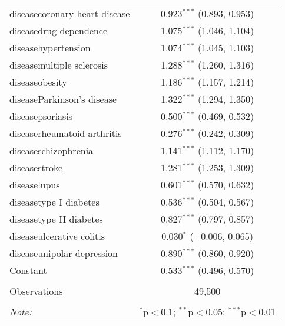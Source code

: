 \begin{table}[!htbp]
\begin{tabular}{@{\extracolsep{5pt}}lc}
  diseasecoronary heart disease & 0.923$^{***}$ (0.893, 0.953) \\ 
  diseasedrug dependence & 1.075$^{***}$ (1.046, 1.104) \\ 
  diseasehypertension & 1.074$^{***}$ (1.045, 1.103) \\ 
  diseasemultiple sclerosis & 1.288$^{***}$ (1.260, 1.316) \\ 
  diseaseobesity & 1.186$^{***}$ (1.157, 1.214) \\ 
  diseaseParkinson's disease & 1.322$^{***}$ (1.294, 1.350) \\ 
  diseasepsoriasis & 0.500$^{***}$ (0.469, 0.532) \\ 
  diseaserheumatoid arthritis & 0.276$^{***}$ (0.242, 0.309) \\ 
  diseaseschizophrenia & 1.141$^{***}$ (1.112, 1.170) \\ 
  diseasestroke & 1.281$^{***}$ (1.253, 1.309) \\ 
  diseaselupus & 0.601$^{***}$ (0.570, 0.632) \\ 
  diseasetype I diabetes & 0.536$^{***}$ (0.504, 0.567) \\ 
  diseasetype II diabetes & 0.827$^{***}$ (0.797, 0.857) \\ 
  diseaseulcerative colitis & 0.030$^{*}$ ($-$0.006, 0.065) \\ 
  diseaseunipolar depression & 0.890$^{***}$ (0.860, 0.920) \\ 
  Constant & 0.533$^{***}$ (0.496, 0.570) \\ 
 \hline \\[-1.8ex] 
Observations & 49,500 \\ 
\hline 
\hline \\[-1.8ex] 
\textit{Note:}  & \multicolumn{1}{r}{$^{*}$p$<$0.1; $^{**}$p$<$0.05; $^{***}$p$<$0.01} \\ 
\end{tabular} 
\end{table} 
